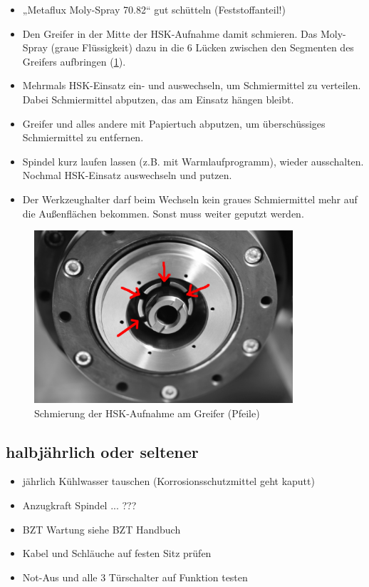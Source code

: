 \documentclass{\basedir/fablab-document}
\begin{document}
\begin{itemize}
	\item „Metaflux Moly-Spray 70.82“ gut schütteln (Feststoffanteil!)
	\item Den Greifer in der Mitte der HSK-Aufnahme damit schmieren. Das Moly-Spray (graue Flüssigkeit) dazu in die 6 Lücken zwischen den Segmenten des Greifers aufbringen (\cref{fig:hsk-greifer}). 
	\item Mehrmals HSK-Einsatz ein- und auswechseln, um Schmiermittel zu verteilen. Dabei Schmiermittel abputzen, das am Einsatz hängen bleibt.
	\item Greifer und alles andere mit Papiertuch abputzen, um überschüssiges Schmiermittel zu entfernen.
	\item Spindel kurz laufen lassen (z.B. mit Warmlaufprogramm), wieder ausschalten. Nochmal HSK-Einsatz auswechseln und putzen.
	\item Der Werkzeughalter darf beim Wechseln kein graues Schmiermittel mehr auf die Außenflächen bekommen. Sonst muss weiter geputzt werden.
\end{itemize}

\begin{figure}[hb]
\centering
\includegraphics[height=6.4cm]{./img/hsk-aufnahme-segmente.jpg}
\caption{Schmierung der HSK-Aufnahme am Greifer (Pfeile)}
\label{fig:hsk-greifer}
\end{figure}

\subsection{halbjährlich oder seltener}

\begin{itemize}
	\item jährlich Kühlwasser tauschen (Korrosionsschutzmittel geht kaputt)
	\item Anzugkraft Spindel ... ???
	\item BZT Wartung siehe BZT Handbuch
	\item Kabel und Schläuche auf festen Sitz prüfen
	\item Not-Aus und alle 3 Türschalter auf Funktion testen
\end{itemize}
\end{document}
